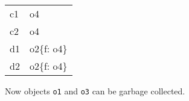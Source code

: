 \documentclass[11pt]{exam}
\begin{document}
\begin{questions}
\begin{framed}
{\begin{enumerate}
                    \begin{tabular}{|l|l|}
                        \hline
                        c1 & o4 \\
                        c2 & o4 \\
                        d1 & o2\{f: o4\} \\
                        d2 & o2\{f: o4\} \\
                        \hline
                    \end{tabular}
            \end{enumerate}
            }
            Now objects {\tt o1} and {\tt o3} can be garbage collected.
	\end{framed}

\end{questions}
\end{document}
